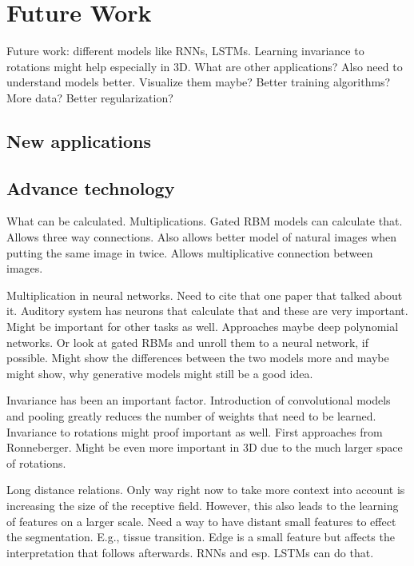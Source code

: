 \chapter{Future Work}

Future work: different models like RNNs, LSTMs. Learning
invariance to rotations might help especially in 3D. What are other
applications? Also need to understand models better. Visualize them maybe?
Better training algorithms? More data? Better regularization?

\section{New applications}

\section{Advance technology}

What can be calculated. Multiplications. Gated RBM models can calculate that.
Allows three way connections. Also allows better model of natural images when
putting the same image in twice. Allows multiplicative connection between
images.

Multiplication in neural networks. Need to cite that one paper that talked about
it. Auditory system has neurons that calculate that and these are very
important. Might be important for other tasks as well. Approaches maybe deep
polynomial networks. Or look at gated RBMs and unroll them to a neural network,
if possible. Might show the differences between the two models more and maybe
might show, why generative models might still be a good idea.

Invariance has been an important factor. Introduction of convolutional models
and pooling greatly reduces the number of weights that need to be learned.
Invariance to rotations might proof important as well. First approaches from
Ronneberger. Might be even more important in 3D due to the much larger space of
rotations.

Long distance relations. Only way right now to take more context into account is
increasing the size of the receptive field. However, this also leads to the
learning of features on a larger scale. Need a way to have distant small
features to effect the segmentation. E.g., tissue transition. Edge is a small
feature but affects the interpretation that follows afterwards. RNNs and esp.
LSTMs can do that.
